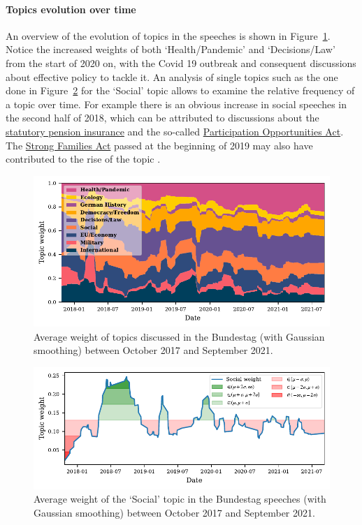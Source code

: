 \documentclass{article}
\begin{document}
\paragraph{Topics evolution over time}
An overview of the evolution of topics in the speeches is shown in Figure~\ref{stacked_area_plot}.
Notice the increased weights of both `Health/Pandemic' and `Decisions/Law' from the start of 2020 on, with the Covid 19 outbreak and consequent discussions about effective policy to tackle it.
An analysis of single topics such as the one done in Figure~\ref{social_topic_plot} for the `Social' topic allows to examine the relative frequency of a topic over time. 
For example there is an obvious increase in social speeches in the second half of 2018, which can be attributed to discussions about the \href{https://dserver.bundestag.de/btd/19/054/1905412.pdf}{statutory pension insurance} and the so-called \href{https://dserver.bundestag.de/btd/19/047/1904725.pdf}{Participation Opportunities Act}. 
The \href{https://dserver.bundestag.de/btd/19/075/1907504.pdf}{Strong Families Act} passed at the beginning of 2019 may also have contributed to the rise of the topic \cite{Bundestag2018}\cite{Bundestag2019}.

\begin{figure}
  \centering
  \includegraphics[width=0.9\linewidth]{images/stacked_area_plot.pdf}
  \captionsetup{width=0.9\linewidth}
  \caption{
    Average weight of topics discussed in the Bundestag (with Gaussian smoothing) between October 2017 and September 2021.
  }
  \label{stacked_area_plot}
\end{figure}

\begin{figure}
  \centering
  \includegraphics[width=0.9\linewidth]{images/Social.pdf}
  \captionsetup{width=0.9\linewidth}
  \caption{
    Average weight of the `Social' topic in the Bundestag speeches (with Gaussian smoothing) between October 2017 and September 2021.
  }
  \label{social_topic_plot}
\end{figure}
\end{document}
